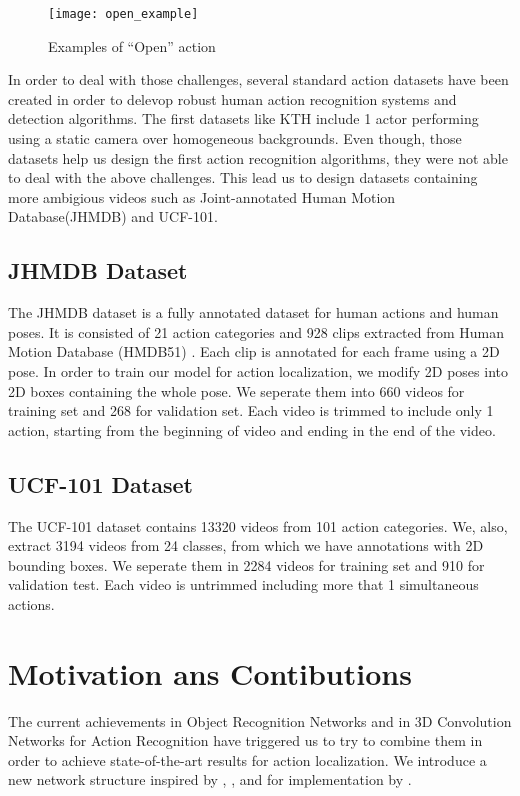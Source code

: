 \begin{figure}[h]
  \centering
  \texttt{[image: open\_example]}
  \caption{Examples of ``Open'' action}
  \label{fig:open_example}

\end{figure}

In order to deal with those challenges, several standard action datasets have been created in order to delevop
robust human action recognition systems and detection algorithms.
The first datasets like KTH\cite{} include 1 actor performing using a static camera over homogeneous backgrounds.
Even though, those datasets help us design the first action recognition algorithms, they were not able to deal with the above
challenges.
This lead us to design datasets containing more ambigious videos such as Joint-annotated Human Motion Database(JHMDB)\cite{}
and UCF-101\cite{}.
\subsection{JHMDB Dataset}
The JHMDB dataset is a fully annotated dataset for human actions and human poses. It is consisted of 21 action categories and 928
clips extracted from Human Motion Database (HMDB51) \cite{}. Each clip is annotated for each frame using a 2D pose.
In order to train our model for action localization, we modify 2D poses into 2D boxes containing the whole pose. We seperate them
into 660 videos for training set and 268 for validation set. Each video is trimmed to include only 1 action, starting from the beginning
of video and ending in the end of the video. 

\subsection{UCF-101 Dataset}
The UCF-101 dataset contains 13320 videos from 101 action categories. We, also, extract 3194 videos from 24 classes, from which
we have annotations with 2D bounding boxes. We seperate them in 2284 videos for training set and 910 for validation test. Each video
is untrimmed including more that 1 simultaneous actions. 

\section{Motivation ans Contibutions}
The current achievements in Object Recognition Networks and in 3D Convolution Networks for Action Recognition have triggered us to try
to combine them in order to achieve state-of-the-art results for action localization. We introduce a new network structure inspired by
\cite{DBLP:journals/corr/HouCS17}, \cite{DBLP:journals/corr/abs-1712-09184},\cite{Ren:2015:FRT:2969239.2969250} and for implementation
by \cite{jjfaster2rcnn}.

